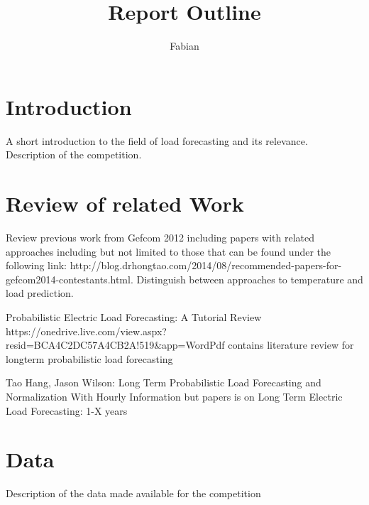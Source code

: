 \documentclass{article}
\begin{document}
\title{Report Outline}
\author{Fabian}

\maketitle

\section{Introduction}
A short introduction to the field of load forecasting and its relevance.\\
Description of the competition.

\section{Review of related Work}
Review previous work from Gefcom 2012 including papers with related approaches including but not limited to those that can be found under the following link: http://blog.drhongtao.com/2014/08/recommended-papers-for-gefcom2014-contestants.html. Distinguish between approaches to temperature and load prediction.\par

Probabilistic Electric Load Forecasting: A Tutorial Review
https://onedrive.live.com/view.aspx?resid=BCA4C2DC57A4CB2A!519&app=WordPdf
contains literature review for longterm probabilistic load forecasting

Tao Hang, Jason Wilson:
Long Term Probabilistic Load Forecasting and Normalization With Hourly Information
but papers is on Long Term Electric Load Forecasting: 1-X years

\section{Data}
Description of the data made available for the competition
\end{document}
